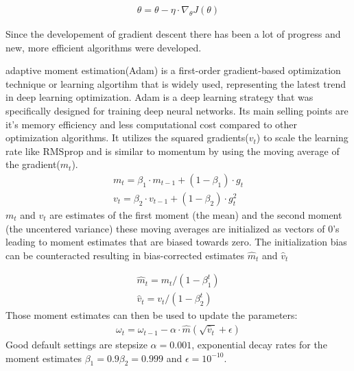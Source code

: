 \documentclass[
a4paper, 
12pt,
grayscalebody, %
abstract=on,
twoside, BCOR10mm, 12pt, DIV13,headinclude, footexclude, final, abstracton, openright
]{ibireprt}
\numberwithin{equation}{chapter}
\numberwithin{table}{chapter}
\numberwithin{figure}{chapter}
\numberwithin{algorithm}{chapter}
\numberwithin{example}{chapter}
\numberwithin{example}{chapter}
\begin{document}
\begin{align}
	\theta = \theta - \eta \cdot \nabla_\theta J(\theta)
\end{align}


 Since the developement of gradient descent there has been a lot of progress and new, more efficient algorithms were developed. 



adaptive moment estimation(Adam)\cite{Kingma2014} is a first-order gradient-based optimization technique or learning algortihm that is widely used, representing the latest trend in deep learning optimization. Adam is a deep learning strategy that was specifically designed for training deep neural networks. Its main selling points are it's memory efficiency and less computational cost compared to other optimization algorithms. It  utilizes the squared gradients($v_t$) to scale the learning rate like RMSprop and  is similar to momentum by using the moving average of the gradient($m_t$).%
\begin{align}
	m_t =\beta_1\cdot m_{t-1} + (1- \beta_1)\cdot g_t \\
	v_t =\beta_2\cdot v_{t-1} + (1- \beta_2)\cdot g_t^2
\end{align}
$m_t$ and $v_t$ are estimates of the first moment (the mean) and the second moment (the uncentered
variance) these moving averages are initialized as vectors of 0's leading to moment estimates that are  biased towards zero. The initialization bias can be counteracted resulting in bias-corrected estimates $\hat{m}_t$ and $\hat{v}_t$

\begin{align}
		\hat{m}_t = m_t/(1- \beta_1^t)\\
	\hat{v}_t = v_t/(1- \beta_2^t)
\end{align}
Those moment estimates can then be used to update the parameters: 
\begin{align}
	\omega_t = \omega_{t-1}-\alpha\cdot\hat{m}(\sqrt{\hat{v}_t}+\epsilon)
\end{align}
Good default settings are stepsize $\alpha = 0.001$, exponential decay rates for the moment estimates $\beta_1 = 0.9 \beta_2 = 0.999 $ and $\epsilon =  10^{-10}$.


\end{document}
